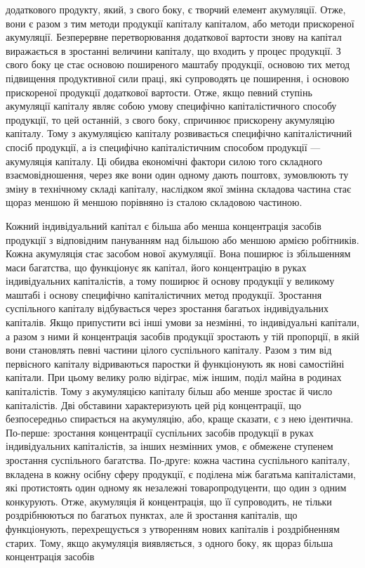 \parcont{}  %
додаткового продукту, який, з свого боку, є творчий елемент
акумуляції. Отже, вони є разом з тим методи продукції капіталу
капіталом, або методи прискореної акумуляції. Безперервне
перетворювання додаткової вартости знову на капітал виражається
в зростанні величини капіталу, що входить у процес продукції.
З свого боку це стає основою поширеного маштабу продукції,
основою тих метод підвищення продуктивної сили праці,
які супроводять це поширення, і основою прискореної продукції
додаткової вартости. Отже, якщо певний ступінь акумуляції
капіталу являє собою умову специфічно капіталістичного способу
продукції, то цей останній, з свого боку, спричинює прискорену
акумуляцію капіталу. Тому з акумуляцією капіталу розвивається
специфічно капіталістичний спосіб продукції, а із специфічно
капіталістичним способом продукції — акумуляція капіталу.
Ці обидва економічні фактори силою того складного взаємовідношення,
через яке вони один одному дають поштовх,
зумовлюють ту зміну в технічному складі капіталу, наслідком
якої змінна складова частина стає щораз меншою й меншою порівняно
із сталою складовою частиною.

Кожний індивідуальний капітал є більша або менша концентрація
засобів продукції з відповідним пануванням над більшою
або меншою армією робітників. Кожна акумуляція стає засобом
нової акумуляції. Вона поширює із збільшенням маси багатства,
що функціонує як капітал, його концентрацію в руках індивідуальних
капіталістів, а тому поширює й основу продукції
у великому маштабі і основу специфічно капіталістичних метод
продукції. Зростання суспільного капіталу відбувається через
зростання багатьох індивідуальних капіталів. Якщо припустити
всі інші умови за незмінні, то індивідуальні капітали, а разом
з ними й концентрація засобів продукції зростають у тій пропорції,
в якій вони становлять певні частини цілого суспільного
капіталу. Разом з тим від первісного капіталу відриваються
паростки й функціонують як нові самостійні капітали. При цьому
велику ролю відіграє, між іншим, поділ майна в родинах капіталістів.
Тому з акумуляцією капіталу більш або менше зростає
й число капіталістів. Дві обставини характеризують цей рід
концентрації, що безпосередньо спирається на акумуляцію,
або, краще сказати, є з нею ідентична. По-перше: зростання концентрації
суспільних засобів продукції в руках індивідуальних
капіталістів, за інших незмінних умов, є обмежене ступенем
зростання суспільного багатства. По-друге: кожна частина суспільного
капіталу, вкладена в кожну осібну сферу продукції,
є поділена між багатьма капіталістами, які протистоять один
одному як незалежні товаропродуценти, що один з одним конкурують.
Отже, акумуляція й концентрація, що її супроводить,
не тільки роздрібнюються по багатьох пунктах, але й зростання
капіталів, що функціонують, перехрещується з утворенням нових
капіталів і роздрібненням старих. Тому, якщо акумуляція виявляється,
з одного боку, як щораз більша концентрація засобів
\parbreak{}  %
